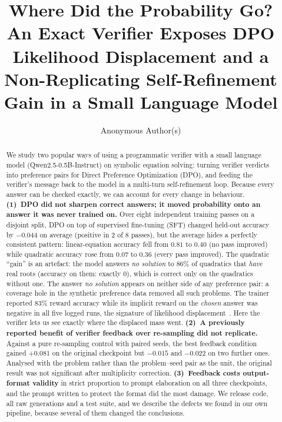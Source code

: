 \documentclass[10pt]{article}
\title{Where Did the Probability Go?\\[2pt]
\large An Exact Verifier Exposes DPO Likelihood Displacement and a\\Non-Replicating Self-Refinement Gain in a Small Language Model}
\author{Anonymous Author(s)}
\date{}
\newcommand{\nosol}{\emph{no solution}}
\begin{document}
\maketitle

\begin{abstract}
We study two popular ways of using a programmatic verifier with a small language model
(Qwen2.5-0.5B-Instruct) on symbolic equation solving: turning verifier verdicts into
preference pairs for Direct Preference Optimization (DPO), and feeding the verifier's
message back to the model in a multi-turn self-refinement loop. Because every answer
can be checked exactly, we can account for every change in behaviour.
\textbf{(1)~DPO did not sharpen correct answers; it moved probability onto an answer it
was never trained on.} Over eight independent training passes on a disjoint split, DPO
on top of supervised fine-tuning (SFT) changed held-out accuracy by $-0.044$ on average
(positive in 2 of 8 passes), but the average hides a perfectly consistent pattern:
linear-equation accuracy fell from $0.81$ to $0.40$ (no pass improved) while quadratic
accuracy rose from $0.07$ to $0.36$ (every pass improved). The quadratic ``gain'' is an
artefact: the model answers \nosol{} to $86\%$ of quadratics that \emph{have} real
roots (accuracy on them: exactly $0$), which is correct only on the quadratics without
one. The answer \nosol{} appears on neither side of any preference pair: a
coverage hole in the synthetic preference data removed all such problems. The trainer
reported $83\%$ reward accuracy while its implicit reward on the \emph{chosen} answer
was negative in all five logged runs, the signature of likelihood
displacement~\citep{razin2025displacement}. Here the verifier lets us see exactly where
the displaced mass went.
\textbf{(2)~A previously reported benefit of verifier feedback over re-sampling did not
replicate.} Against a pure re-sampling control with paired seeds, the best feedback
condition gained $+0.081$ on the original checkpoint but $-0.015$ and $-0.022$ on two
further ones. Analysed with the problem rather than the problem--seed pair as the unit,
the original result was not significant after multiplicity correction.
\textbf{(3)~Feedback costs output-format validity} in strict proportion to prompt
elaboration on all three checkpoints, and the prompt written to protect the format did
the most damage. We release code, all raw generations and a test suite, and we
describe the defects we found in our own pipeline, because several of them changed the
conclusions.
\end{abstract}
\end{document}
